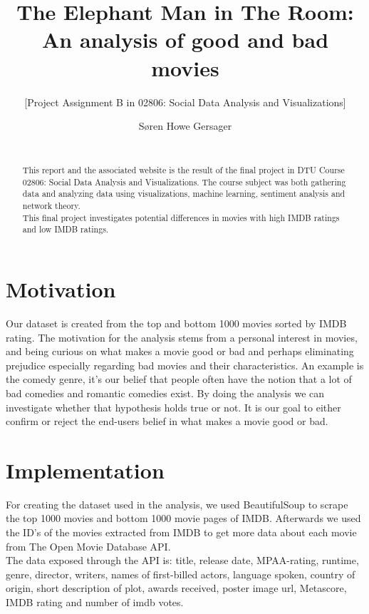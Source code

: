 \documentclass{acm_proc_article-sp}
\begin{document}
\title{The Elephant Man in The Room: An analysis of good and bad movies}
\subtitle{[Project Assignment B in 02806: Social Data Analysis and Visualizations]
}
\author
{
	\alignauthor Søren Howe Gersager\\
       \\
}
\maketitle
\begin{abstract}
This report and the associated website\cite{website} is the result of the final project in DTU Course 02806: Social Data Analysis and Visualizations. The course subject was both gathering data and analyzing data using visualizations, machine learning, sentiment analysis and network theory.\\
This final project investigates potential differences in movies with high IMDB ratings and low IMDB ratings.
\end{abstract}

\section{Motivation}
Our dataset is created from the top and bottom 1000 movies sorted by IMDB rating\cite{imdb-top}\cite{imdb-bottom}. The motivation for the analysis stems from a personal interest in movies, and being curious on what makes a movie good or bad and perhaps eliminating prejudice especially regarding bad movies and their characteristics. An example is the comedy genre, it's our belief that people often have the notion that a lot of bad comedies and romantic comedies exist. By doing the analysis we can investigate whether that hypothesis holds true or not. It is our goal to either confirm or reject the end-users belief in what makes a movie good or bad.  
\section{Implementation}
For creating the dataset used in the analysis, we used BeautifulSoup\cite{BS4} to scrape the top 1000 movies and bottom 1000 movie pages of IMDB\cite{IMDB}. Afterwards we used the ID's of the movies extracted from IMDB to get more data about each movie from The Open Movie Database API\cite{OMDB}.\\ The data exposed through the API is: title, release date, MPAA-rating, runtime, genre, director, writers, names of first-billed actors, language spoken, country of origin, short description of plot, awards received, poster image url, Metascore, IMDB rating and number of imdb votes.   
\end{document}

